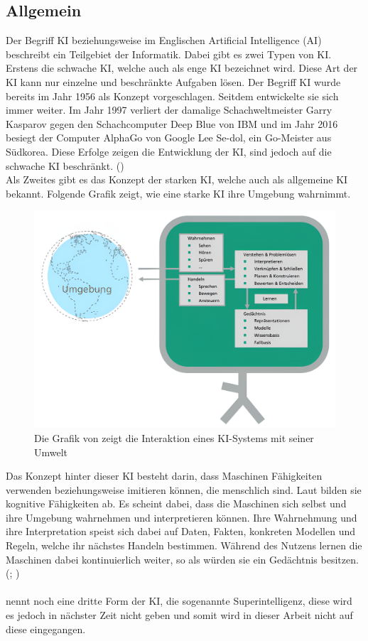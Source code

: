 \documentclass[12pt,toc=bib,toc=listof]{scrreprt}
\begin{document}
\subsection{Allgemein} %
\label{sec:allgemein}
Der Begriff KI beziehungsweise im Englischen Artificial Intelligence (AI) beschreibt ein Teilgebiet der Informatik. Dabei gibt es zwei Typen von KI. Erstens die schwache KI, welche auch als enge KI bezeichnet wird. Diese Art der KI kann nur einzelne und beschränkte Aufgaben lösen. Der Begriff KI wurde bereits im Jahr 1956 als Konzept vorgeschlagen. Seitdem entwickelte sie sich immer weiter. Im Jahr 1997 verliert der damalige Schachweltmeister Garry Kasparov gegen den Schachcomputer Deep Blue von IBM und im Jahr 2016 besiegt der Computer AlphaGo von Google Lee Se-dol, ein Go-Meister aus Südkorea. Diese Erfolge zeigen die Entwicklung der KI, sind jedoch auf die schwache KI beschränkt. (\cite{Hecker2018})\\
\newpage
\noindent Als Zweites gibt es das Konzept der starken KI, welche auch als allgemeine KI bekannt. Folgende Grafik zeigt, wie eine starke KI ihre Umgebung wahrnimmt.
\begin{figure} [H]
    \centering
    \includegraphics[width=0.75\linewidth]{./Bilder/Fraunhofer_KI-Umgebung.png}
    \caption{Die Grafik von \textcite{Hecker2018} zeigt die Interaktion eines KI-Systems mit seiner Umwelt}
    \label{fig:enter-label}
\end{figure}
\noindent Das Konzept hinter dieser KI besteht darin, dass Maschinen Fähigkeiten verwenden beziehungsweise imitieren können, die menschlich sind. Laut \textcite{Hecker2018} bilden sie kognitive Fähigkeiten ab. Es scheint dabei, dass die Maschinen sich selbst und ihre Umgebung wahrnehmen und interpretieren können. Ihre Wahrnehmung und ihre Interpretation speist sich dabei auf Daten, Fakten, konkreten Modellen und Regeln, welche ihr nächstes Handeln bestimmen. Während des Nutzens lernen die Maschinen dabei kontinuierlich weiter, so als würden sie ein Gedächtnis besitzen. (\cite{Bhatt2021}; \cite{Zhu2021})\\
\\
\textcite{Hecker2018} nennt noch eine dritte Form der KI, die sogenannte Superintelligenz, diese wird es jedoch in nächster Zeit nicht geben und somit wird in dieser Arbeit nicht auf diese eingegangen. 
\newpage
\end{document}
